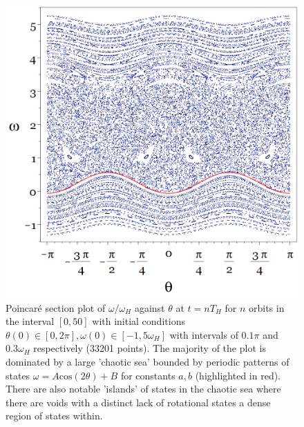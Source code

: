 \documentclass[10pt, twocolumn]{article} %
\begin{document}
\begin{figure}[tb!]
  \centering
  \includegraphics[width=0.95\columnwidth]{poincare_section.png}
  \caption{Poincar\'e section plot of $\omega / \omega_H$ against $\theta$ at $t = nT_H$ for $n$ orbits in the interval $[0,50]$ with initial conditions $\theta(0) \in [0, 2 \pi], \omega(0) \in [-1, 5 \omega_H]$ with intervals of $0.1 \pi$ and $0.3 \omega_H$ respectively (33201 points). The majority of the plot is dominated by a large 'chaotic sea' bounded by periodic patterns of states $\omega = A \mathrm{cos}(2\theta)+B$ for constants $a,b$ (highlighted in red). There are also notable 'islands' of states in the chaotic sea where there are voids with a distinct lack of rotational states a dense region of states within.}
\label{poincare_section}
\end{figure}
\end{document}
